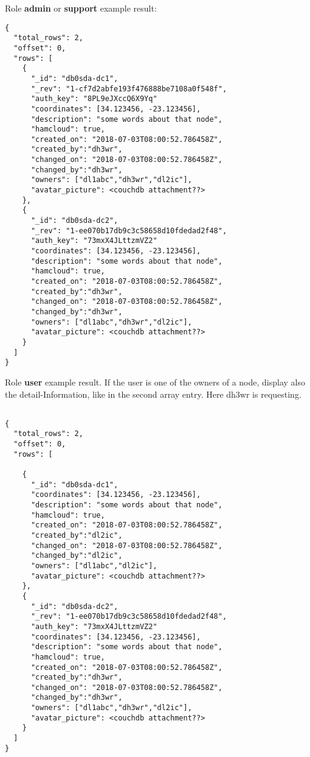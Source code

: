 Role \textbf{admin} or \textbf{support} example result:
\begin{lstlisting}
{
  "total_rows": 2,
  "offset": 0,
  "rows": [
    {
      "_id": "db0sda-dc1",
      "_rev": "1-cf7d2abfe193f476888be7108a0f548f",
      "auth_key": "8PL9eJXccQ6X9Yq"
      "coordinates": [34.123456, -23.123456],
      "description": "some words about that node",
      "hamcloud": true,
      "created_on": "2018-07-03T08:00:52.786458Z",
      "created_by":"dh3wr",
      "changed_on": "2018-07-03T08:00:52.786458Z",
      "changed_by":"dh3wr",
      "owners": ["dl1abc","dh3wr","dl2ic"],
      "avatar_picture": <couchdb attachment??>
    },
    {
      "_id": "db0sda-dc2",
      "_rev": "1-ee070b17db9c3c58658d10fdedad2f48",
      "auth_key": "73mxX4JLttzmVZ2"
      "coordinates": [34.123456, -23.123456],
      "description": "some words about that node",
      "hamcloud": true,
      "created_on": "2018-07-03T08:00:52.786458Z",
      "created_by":"dh3wr",
      "changed_on": "2018-07-03T08:00:52.786458Z",
      "changed_by":"dh3wr",
      "owners": ["dl1abc","dh3wr","dl2ic"],
      "avatar_picture": <couchdb attachment??>
    }
  ]
}
\end{lstlisting}

Role \textbf{user} example result. If the user is one of the owners of a node, display also the detail-Information, like in the second array entry. Here dh3wr is requesting.
\begin{lstlisting}

{
  "total_rows": 2,
  "offset": 0,
  "rows": [

    {
      "_id": "db0sda-dc1",
      "coordinates": [34.123456, -23.123456],
      "description": "some words about that node",
      "hamcloud": true,
      "created_on": "2018-07-03T08:00:52.786458Z",
      "created_by":"dl2ic",
      "changed_on": "2018-07-03T08:00:52.786458Z",
      "changed_by":"dl2ic",
      "owners": ["dl1abc","dl2ic"],
      "avatar_picture": <couchdb attachment??>
    },
    {
      "_id": "db0sda-dc2",
      "_rev": "1-ee070b17db9c3c58658d10fdedad2f48",
      "auth_key": "73mxX4JLttzmVZ2"
      "coordinates": [34.123456, -23.123456],
      "description": "some words about that node",
      "hamcloud": true,
      "created_on": "2018-07-03T08:00:52.786458Z",
      "created_by":"dh3wr",
      "changed_on": "2018-07-03T08:00:52.786458Z",
      "changed_by":"dh3wr",
      "owners": ["dl1abc","dh3wr","dl2ic"],
      "avatar_picture": <couchdb attachment??>
    }
  ]
}
\end{lstlisting}

